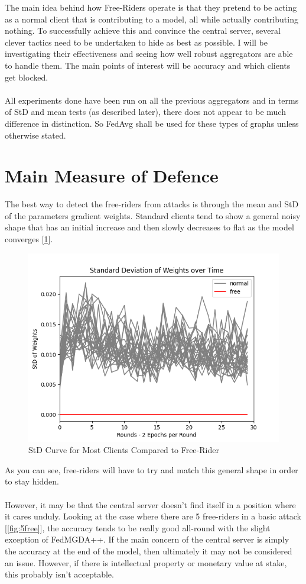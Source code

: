 The main idea behind how Free-Riders operate is that they pretend to be acting as a normal client that is contributing to a model, all while actually contributing nothing.
To successfully achieve this and convince the central server, several clever tactics need to be undertaken to hide as best as possible.
I will be investigating their effectiveness and seeing how well robust aggregators are able to handle them.
The main points of interest will be accuracy and which clients get blocked.
\\ \\
All experiments done have been run on all the previous aggregators and in terms of StD and mean tests (as described later), there does not appear to be much difference in distinction.
So FedAvg shall be used for these types of graphs unless otherwise stated.


\section{Main Measure of Defence}
The best way to detect the free-riders from attacks is through the mean and StD of the parameters gradient weights.
Standard clients tend to show a general noisy shape that has an initial increase and then slowly decreases to flat as the model converges [\ref{fig:std_basic}].
\begin{figure}[htbp]
	\centering
    \includegraphics[scale=0.5]{free_riders/graphs/1_free.png}
	\caption{StD Curve for Most Clients Compared to Free-Rider}
	\label{fig:std_basic}
\end{figure}
As you can see, free-riders will have to try and match this general shape in order to stay hidden.
\\ \\
However, it may be that the central server doesn't find itself in a position where it cares unduly.
Looking at the case where there are 5 free-riders in a basic attack [\ref{fig:5free}], the accuracy tends to be really good all-round with the slight exception of FedMGDA++.
If the main concern of the central server is simply the accuracy at the end of the model, then ultimately it may not be considered an issue.
However, if there is intellectual property or monetary value at stake, this probably isn't acceptable.



